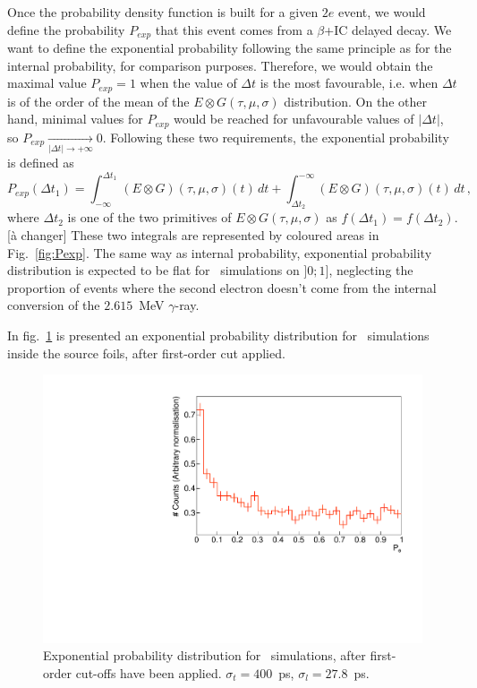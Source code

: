 Once the probability density function is built for a given $2e$ event, we would define the probability $P_{exp}$ that this event comes from a $\beta$+IC delayed decay.
We want to define the exponential probability following the same principle as for the internal probability, for comparison purposes.
Therefore, we would obtain the maximal value $P_{exp}=1$ when the value of $\Delta t$ is the most favourable, i.e. when $\Delta t$ is of the order of the mean of the $E \otimes G (\tau,\mu,\sigma)$ distribution.
On the other hand, minimal values for $P_{exp}$ would be reached for unfavourable values of $|\Delta t|$, so $P_{exp} \xrightarrow[|\Delta t| \rightarrow +\infty]{} 0$.
Following these two requirements, the exponential probability is defined as
\begin{equation}
  P_{exp}(\Delta t_{1}) = \int_{-\infty}^{\Delta t_{1}} (E \otimes G) (\tau,\mu,\sigma)(t)\, dt + \int_{\Delta t_{2}}^{-\infty} (E \otimes G) (\tau,\mu,\sigma)(t)\, dt\,,
\end{equation}
where $\Delta t_{2}$ is one of the two primitives of $E \otimes G (\tau,\mu,\sigma)$ as $f(\Delta t_{1})=f(\Delta t_{2})$.[à changer]
These two integrals are represented by coloured areas in Fig.~\ref{fig:Pexp}.
The same way as internal probability, exponential probability distribution is expected to be flat for \Tl\ simulations on $]0;1]$, neglecting the proportion of events where the second electron doesn't come from the internal conversion of the $2.615$~MeV $\gamma$-ray.

In fig.~\ref{fig:Pexp_Tl} is presented an exponential probability distribution for \Tl\ simulations inside the source foils, after first-order cut applied.
\begin{figure}[!h]
  \centering
  \includegraphics[width=13cm]{timedifference/fig_timediff/208Tl_expo.pdf}
  \caption{Exponential probability distribution for \Tl\ simulations, after first-order cut-offs have been applied.
    $\sigma_{t}=400$~ps, $\sigma_{l}=27.8$~ps.
    \label{fig:Pexp_Tl}}
\end{figure}

